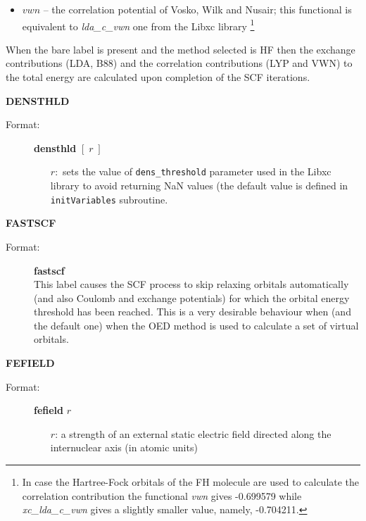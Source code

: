 \documentclass[10pt,a4paper]{article}
\newcommand{\ft}[1]{\texttt{#1}}
\begin{document}
\begin{description}
\begin{description}
\begin{itemize}
\begin{itemize}
\item $vwn$ -- the correlation potential of Vosko, Wilk and Nusair;
  this functional is equivalent to \textsl{lda\_c\_vwn} one from the Libxc library%
    \footnote{In case the Hartree-Fock orbitals of the FH molecule are used to calculate
      the correlation contribution the functional \textsl{vwn} gives -0.699579 while
      \textsl{xc\_lda\_c\_vwn} gives a slightly smaller value, namely, -0.704211.}

\end{itemize}
\end{itemize}
\end{description}
When the bare label is present and the method selected is HF then the exchange
contributions (LDA, B88) and the correlation contributions (LYP and VWN) to the total
energy are calculated upon completion of the SCF iterations.

\item \textbf{DENSTHLD}
\begin{description}
\item[Format:] \textbf{densthld}  $[\;r\;]$ \\
\begin{itemize}
\item[$r:$] sets the value of \texttt{dens\_threshold} parameter used in the
  Libxc library to avoid returning NaN values (the default value is defined in
  \ft{initVariables} subroutine.%
\end{itemize}
\end{description}

\item \textbf{FASTSCF}
\begin{description}
\item[Format:] \textbf{fastscf} \\
  This label causes the SCF process to skip relaxing orbitals automatically 
  (and also Coulomb and exchange potentials) for which the orbital energy
  threshold has been reached. This is a very desirable behaviour when
  (and the default one) when the OED method is used to calculate a set of
  virtual orbitals.
   \end{description}

\item \textbf{FEFIELD}
\begin{description}
\item[Format:] \textbf{fefield} $r$
\begin{itemize}
\item[$r$:] a strength of an external static electric field directed along
  the internuclear axis (in atomic units)
\end{itemize}
\end{description}



\end{description}
\end{document}
